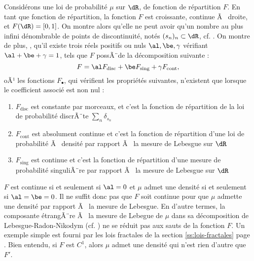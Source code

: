 {{\begin{rem}
  Considérons une loi de probabilité $\mu$ sur $\dR$, de fonction de
  répartition $F$. En tant que fonction de répartition, la fonction $F$ est
  croissante, continue Ã  droite, et $F(\dR)=[0,1]$. On montre alors qu'elle ne
  peut avoir qu'un nombre au plus infini dénombrable de points de discontinuité, notés
  $(s_n)_n\subset\dR$, cf.  \cite[prop. III.2.2 page
  48]{barbe-ledoux}. On montre de plus, \cite[III, pages 49-50]{barbe-ledoux},
  qu'il existe trois réels positifs ou nuls $\al, \be, \gamma$ vérifiant
  $\al+\be+\gamma=1$, tels que $F$ possÃ¨de la décomposition suivante :
  $$
  F=\al F_{\text{disc}} + \be F_{\text{sing}} + \gamma F_{\text{cont}},
  $$
  oÃ¹ les fonctions $F_\bullet$, qui vérifient les propriétés suivantes,
  n'existent que lorsque le coefficient associé est non nul :
  \begin{enumerate}
  \item $F_{\text{disc}}$ est constante par morceaux, et c'est la fonction de
    répartition de la loi de probabilité discrÃ¨te
    $\sum_n\delta_{s_n}$
  \item $F_{\text{cont}}$ est absolument continue et c'est la fonction de
    répartition d'une loi de probabilité Ã  densité par rapport Ã  la mesure de
    Lebesgue sur $\dR$
  \item $F_{\text{sing}}$ est continue et c'est la fonction de répartition
    d'une mesure de probabilité singuliÃ¨re par rapport Ã  la mesure de Lebesgue
    sur $\dR$
  \end{enumerate}
  $F$ est continue si et seulement si $\al=0$ et $\mu$ admet une densité si et
  seulement si $\al=\be=0$.  Il ne suffit donc pas que $F$ soit continue pour
  que $\mu$ admette une densité par rapport Ã  la mesure de Lebesgue. En
  d'autre termes, la composante étrangÃ¨re Ã  la mesure de Lebegue de $\mu$ dans
  sa décomposition de Lebesgue-Radon-Nikodym (cf. \cite[thm 6.9, page
  117]{rudin}) ne se réduit pas aux sauts de la fonction $F$. Un exemple
  simple est fourni par les lois fractales de la section
  \ref{ss:lois-fractales} page \pageref{ss:lois-fractales}.  Bien entendu, si
  $F$ est $C^1$, alors $\mu$ admet une densité qui n'est rien d'autre que
  $F'$.
\end{rem}

}}
